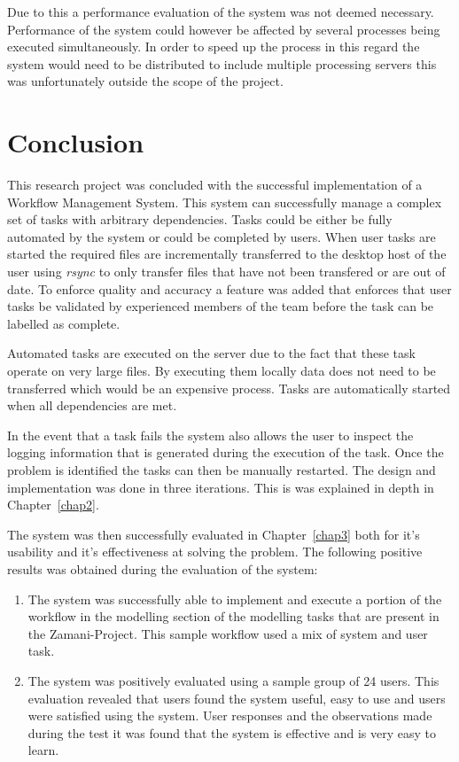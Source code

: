 \documentclass[12pt,a4paper]{report}
\begin{document}
Due to this a performance evaluation of the system was not deemed necessary.
Performance of the system could however be affected by several processes being
executed simultaneously. In order to speed up the process in this regard the
system would need to be distributed to include multiple processing servers this
was unfortunately outside the scope of the project.


\chapter{Conclusion\label{chap4}}
This research project was concluded with the successful implementation of a
Workflow Management System. This system can successfully manage a complex set
of tasks with arbitrary dependencies. Tasks could be either be fully automated
by the system or could be completed by users. When user tasks are started the 
required files are incrementally transferred to the desktop host of the user
using \emph{rsync} to only transfer files that have not been transfered or are 
out of date. To enforce quality and accuracy a feature was added that enforces
that user tasks be validated by experienced members of the team before the task
can be labelled as complete.

Automated tasks are executed on the
server due to the fact that these task operate on very large files. By executing
them locally data does not need to be transferred which would be an expensive
process. Tasks are automatically started when all dependencies are met. 

In the event that a task fails the system also allows the user to inspect the
logging information that is generated during the execution of the task. Once the
problem is identified the tasks can then be manually restarted.  The design and
implementation was done in three iterations. This is was explained in depth in 
Chapter~\ref{chap2}.


The system was then successfully evaluated in Chapter~\ref{chap3} both for it's
usability and it's effectiveness at solving the problem. The following positive
results was obtained during the evaluation of the system:
\begin{enumerate}
    \item The system was successfully able to implement and execute a portion of
        the workflow in the modelling section of the modelling tasks that are
        present in the Zamani-Project. This sample workflow used a mix of system
        and user task.
    \item The system was positively evaluated using a sample group of 24 users.
        This evaluation revealed that users found the system useful, easy to
        use and users were satisfied using the system. User responses and the 
        observations made during the test it was found that the system is
        effective and is very easy to learn. 
\end{enumerate}
\end{document}
